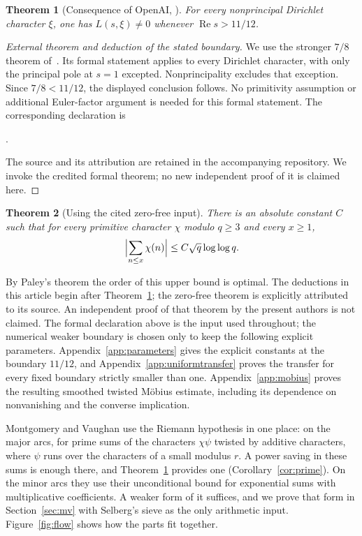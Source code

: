 \documentclass[screen,reqno]{aomart}
\numberwithin{equation}{section}
\newtheorem{theorem}{Theorem}[section]
\theoremstyle{definition}
\renewcommand{\Re}{\operatorname{Re}}
\begin{document}
\begin{theorem}[Consequence of OpenAI, {\cite[Theorem 1.1]{OAI26}}]
\label{thm:zerofree}
For every nonprincipal Dirichlet character $\xi$, one has
$L(s,\xi)\ne0$ whenever $\Re s>11/12$.
\end{theorem}

\begin{proof}[External theorem and deduction of the stated boundary]
We use the stronger $7/8$ theorem of~\cite{OAI26}. Its formal statement
applies to every Dirichlet character, with only the principal pole at
$s=1$ excepted. Nonprincipality excludes that exception. Since
$7/8<11/12$, the displayed conclusion follows. No primitivity assumption
or additional Euler-factor argument is needed for this formal statement.
The corresponding declaration is
\begin{center}\footnotesize
{}.
\end{center}
The source and its attribution are retained in the accompanying repository.
We invoke the credited formal theorem; no new independent proof of it is
claimed here.
\end{proof}

\begin{theorem}[Using the cited zero-free input]\label{thm:pv}
There is an absolute constant $C$ such that for every primitive character
$\chi$ modulo $q\ge3$ and every $x\ge1$,
\[
  \Bigl|\sum_{n\le x}\chi(n)\Bigr|\le C\sqrt q\log\log q.
\]
\end{theorem}

By Paley's theorem the order of this upper bound is optimal. The
deductions in this article begin after Theorem~\ref{thm:zerofree}; the
zero-free theorem is explicitly attributed to its source. An independent
proof of that theorem by the present authors is not claimed. The formal declaration above is the input used throughout; the numerical
weaker boundary is chosen only to keep the following explicit parameters. Appendix~\ref{app:parameters} gives the explicit
constants at the boundary $11/12$, and Appendix~\ref{app:uniformtransfer}
proves the transfer for every fixed boundary strictly smaller than one.
Appendix~\ref{app:mobius} proves the resulting smoothed twisted M\"obius
estimate, including its dependence on nonvanishing and the converse implication.

Montgomery and Vaughan use the Riemann hypothesis in one place: on the major arcs, for prime sums
of the characters $\chi\psi$ twisted by additive characters, where $\psi$ runs over the characters
of a small modulus $r$. A power saving in these sums is enough there, and
Theorem~\ref{thm:zerofree} provides one (Corollary~\ref{cor:prime}). On the minor arcs they use
their unconditional bound for exponential sums with multiplicative coefficients. A weaker form of
it suffices, and we prove that form in Section~\ref{sec:mv} with Selberg's sieve as the only
arithmetic input. Figure~\ref{fig:flow} shows how the parts fit together.
\end{document}
